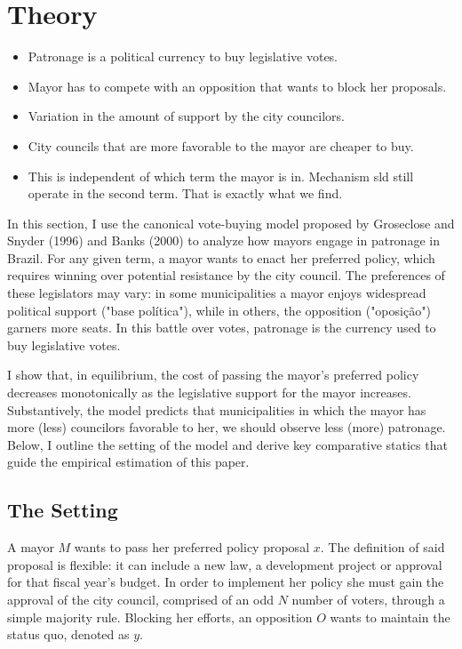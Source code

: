 \documentclass[12pt,a4paper]{article}
\begin{document}
\section*{Theory}

\begin{itemize}
    \item Patronage is a political currency to buy legislative votes. 
    \item Mayor has to compete with an opposition that wants to block her proposals.
    \item Variation in the amount of support by the city councilors.
    \item City councils that are more favorable to the mayor are cheaper to buy.
    \item This is independent of which term the mayor is in. Mechanism sld still operate in the second term. That is exactly what we find.
\end{itemize}

In this section, I use the canonical vote-buying model proposed by Groseclose and Snyder (1996) and Banks (2000) to analyze how mayors engage in patronage in Brazil. For any given term, a mayor wants to enact her preferred policy, which requires winning over potential resistance by the city council. The preferences of these legislators may vary: in some municipalities a mayor enjoys widespread political support ("base política"), while in others, the opposition ("oposição") garners more seats. In this battle over votes, patronage is the currency used to buy legislative votes.

I show that, in equilibrium, the cost of passing the mayor's preferred policy decreases monotonically as the legislative support for the mayor increases. Substantively, the model predicts that municipalities in which the mayor has more (less) councilors favorable to her, we should observe less (more) patronage. Below, I outline the setting of the model and derive key comparative statics that guide the empirical estimation of this paper.

\subsection*{The Setting}

A mayor $M$ wants to pass her preferred policy proposal $x$. The definition of said proposal is flexible: it can include a new law, a development project or approval for that fiscal year's budget. In order to implement her policy she must gain the approval of the city council, comprised of an odd $N$ number of voters, through a simple majority rule. Blocking her efforts, an opposition $O$ wants to maintain the status quo, denoted as $y$.
\end{document}
